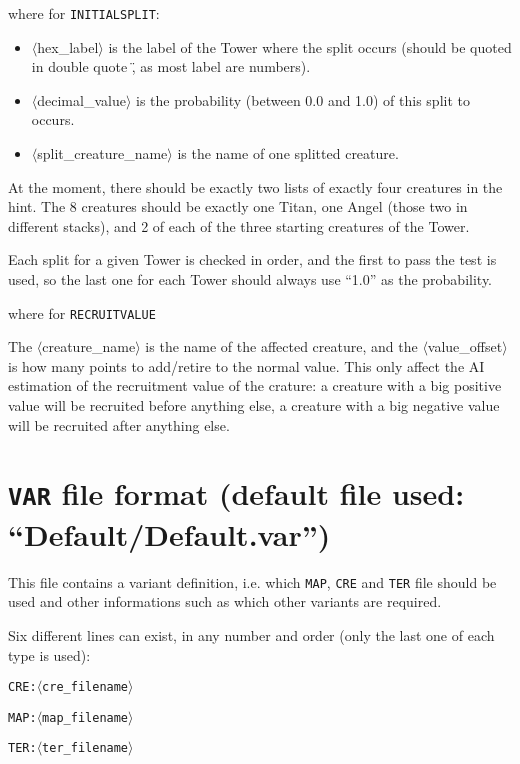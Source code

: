 \documentclass{article}
\begin{document}
where for \texttt{INITIALSPLIT}:

\begin{itemize}
\item $\langle$hex\_label$\rangle$ is the label of the Tower where the split occurs (should be quoted in double quote \", as most label are numbers).
\item $\langle$decimal\_value$\rangle$ is the probability (between 0.0 and 1.0) of this split to occurs.
\item $\langle$split\_creature\_name$\rangle$ is the name of one splitted creature.
\end{itemize}

At the moment, there should be exactly two lists of exactly four creatures in the hint. The 8 creatures should be exactly one Titan, one Angel (those two in different stacks), and 2 of each of the three starting creatures of the Tower.

Each split for a given Tower is checked in order, and the first to pass the test is used, so the last one for each Tower should always use ``1.0'' as the probability.

where for \texttt{RECRUITVALUE}

The $\langle$creature\_name$\rangle$ is the name of the affected creature, and the $\langle$value\_offset$\rangle$ is how many points to add/retire to the normal value. This only affect the AI estimation of the recruitment value of the crature: a creature with a big positive value will be recruited before anything else, a creature with a big negative value will be recruited after anything else.

\section{\texttt{VAR} file format (default file used: ``Default/Default.var'')}
\label{VAR}

This file contains a variant definition, i.e. which
\texttt{MAP}, \texttt{CRE} and \texttt{TER} file should be used and other informations such as which other variants are required.

Six different lines can exist, in any number and order (only the last one of each type is used):

\texttt{\texttt{CRE}:$\langle$cre\_filename$\rangle$}

\texttt{\texttt{MAP}:$\langle$map\_filename$\rangle$}

\texttt{\texttt{TER}:$\langle$ter\_filename$\rangle$}
\end{document}
